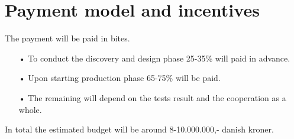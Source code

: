 \section{Payment model and incentives}
The payment will be paid in bites. 
\begin{enumerate}
\item[•] To conduct the discovery and design phase 25-35\% will paid in advance. 
\item[•] Upon starting production phase 65-75\% will be paid. 
\item[•] The remaining will depend on the tests result and the cooperation as a whole.
\end{enumerate}

In total the estimated budget will be around 8-10.000.000,- danish kroner. 